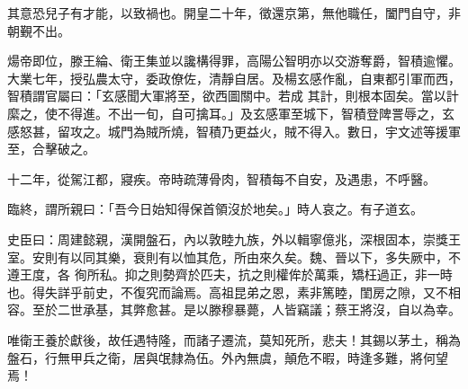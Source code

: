 \begin{pinyinscope}
 其意恐兒子有才能，以致禍也。開皇二十年，徵還京第，無他職任，闔門自守，非朝覲不出。



 煬帝即位，滕王綸、衛王集並以讒構得罪，高陽公智明亦以交游奪爵，智積逾懼。大業七年，授弘農太守，委政僚佐，清靜自居。及楊玄感作亂，自東都引軍而西，智積謂官屬曰：「玄感聞大軍將至，欲西圖關中。若成
 其計，則根本固矣。當以計縻之，使不得進。不出一旬，自可擒耳。」及玄感軍至城下，智積登陴詈辱之，玄感怒甚，留攻之。城門為賊所燒，智積乃更益火，賊不得入。數日，宇文述等援軍至，合擊破之。



 十二年，從駕江都，寢疾。帝時疏薄骨肉，智積每不自安，及遇患，不呼醫。



 臨終，謂所親曰：「吾今日始知得保首領沒於地矣。」時人哀之。有子道玄。



 史臣曰：周建懿親，漢開盤石，內以敦睦九族，外以輯寧億兆，深根固本，崇獎王室。安則有以同其樂，衰則有以恤其危，所由來久矣。魏、晉以下，多失厥中，不遵王度，各
 徇所私。抑之則勢齊於匹夫，抗之則權侔於萬乘，矯枉過正，非一時也。得失詳乎前史，不復究而論焉。高祖昆弟之恩，素非篤睦，閨房之隙，又不相容。至於二世承基，其弊愈甚。是以滕穆暴薨，人皆竊議；蔡王將沒，自以為幸。



 唯衛王養於獻後，故任遇特隆，而諸子遷流，莫知死所，悲夫！其錫以茅土，稱為盤石，行無甲兵之衛，居與氓隸為伍。外內無虞，顛危不暇，時逢多難，將何望焉！



\end{pinyinscope}